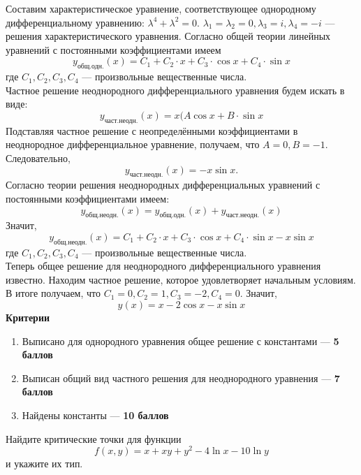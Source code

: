 \documentclass[addpoints, answers]{exam} %
\begin{document}
\begin{questions}
\begin{solution}
Составим характеристическое уравнение, соответствующее однородному дифференциальному уравнению: $\lambda^4+\lambda^2=0$.
\smallskip
$\lambda_1=\lambda_2=0, \lambda_3=i,\lambda_4=-i$ --- решения характеристического уравнения.
Согласно общей теории линейных уравнений с постоянными коэффициентами имеем
\[
y_{\text{общ.одн.}}(x)=C_1+C_2\cdot x+C_3\cdot \cos x+C_4\cdot \sin x
\]
  где $C_1,C_2,C_3,C_4$ --- произвольные вещественные числа.\\
Частное решение неоднородного дифференциального уравнения будем искать в виде:
\[
y_{\text{част.неодн.}}(x)=x(A \cos x+B\cdot \sin x
\]
Подставляя частное решение с неопределёнными коэффициентами в неоднородное дифференциальное уравнение, получаем, что $A=0, B=-1$. \\
Следовательно,
\[
y_{\text{част.неодн.}}(x)=-x\sin x.
\]
Согласно теории решения неоднородных дифференциальных уравнений с постоянными коэффициентами имеем:
\[
y_{\text{общ.неодн.}}(x)=y_{\text{общ.одн.}}(x)+y_{\text{част.неодн.}}(x)
\]
Значит,
\[
y_{\text{общ.неодн.}}(x)=C_1+C_2\cdot x+C_3\cdot \cos x+C_4\cdot \sin x-x\sin x
\] где $C_1,C_2,C_3,C_4$ --- произвольные вещественные числа.\\
Теперь общее решение для неоднородного дифференциального уравнения известно. Находим частное решение, которое удовлетворяет начальным условиям. В итоге получаем, что $C_1=0, C_2=1, C_3=-2, C_4=0$. Значит,
\[
y(x)=x-2\cos x-x\sin x
\]
\textbf{Критерии}
\begin{enumerate}
\item Выписано для однородного уравнения общее решение с константами --- \textbf{5 баллов}
\item Выписан общий вид частного решения для неоднородного уравнения --- \textbf{7 баллов}
\item Найдены константы --- \textbf{10 баллов}
\end{enumerate}
\end{solution}

\question Найдите критические точки для функции
\[
f(x,y)=x+xy+y^2-4\ln x-10\ln y
\]
и укажите их тип.\\


\end{questions}
\end{document}
